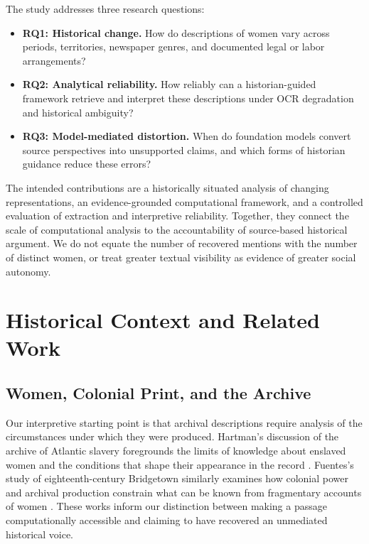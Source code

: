 \documentclass[sigconf]{acmart}
\begin{document}
The study addresses three research questions:
\begin{itemize}
  \item \textbf{RQ1: Historical change.} How do descriptions of women vary across periods, territories, newspaper genres, and documented legal or labor arrangements?
  \item \textbf{RQ2: Analytical reliability.} How reliably can a historian-guided framework retrieve and interpret these descriptions under OCR degradation and historical ambiguity?
  \item \textbf{RQ3: Model-mediated distortion.} When do foundation models convert source perspectives into unsupported claims, and which forms of historian guidance reduce these errors?
\end{itemize}

The intended contributions are a historically situated analysis of changing representations, an evidence-grounded computational framework, and a controlled evaluation of extraction and interpretive reliability. Together, they connect the scale of computational analysis to the accountability of source-based historical argument. We do not equate the number of recovered mentions with the number of distinct women, or treat greater textual visibility as evidence of greater social autonomy.

\section{Historical Context and Related Work}
\label{sec:related}

\subsection{Women, Colonial Print, and the Archive}

Our interpretive starting point is that archival descriptions require analysis of the circumstances under which they were produced. Hartman's discussion of the archive of Atlantic slavery foregrounds the limits of knowledge about enslaved women and the conditions that shape their appearance in the record \citep{hartman2008venus}. Fuentes's study of eighteenth-century Bridgetown similarly examines how colonial power and archival production constrain what can be known from fragmentary accounts of women \citep{fuentes2016dispossessed}. These works inform our distinction between making a passage computationally accessible and claiming to have recovered an unmediated historical voice.
\end{document}
